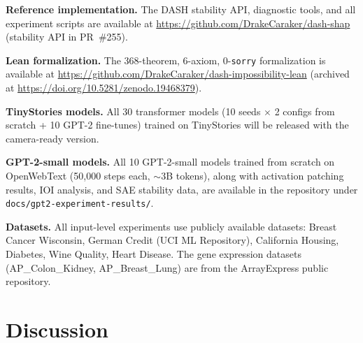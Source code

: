 \documentclass{article}
\begin{document}
\begin{sloppypar}
\noindent\textbf{Reference implementation.} The DASH stability API, diagnostic tools, and all experiment scripts are available at \url{https://github.com/DrakeCaraker/dash-shap} (stability API in PR~\#255).

\noindent\textbf{Lean formalization.} The 368-theorem, 6-axiom, 0-\texttt{sorry} formalization is available at \url{https://github.com/DrakeCaraker/dash-impossibility-lean} (archived at \url{https://doi.org/10.5281/zenodo.19468379}).

\noindent\textbf{TinyStories models.} All 30 transformer models (10 seeds $\times$ 2 configs from scratch + 10 GPT-2 fine-tunes) trained on TinyStories \citep{eldan2023tinystories} will be released with the camera-ready version.

\noindent\textbf{GPT-2-small models.} All 10 GPT-2-small models trained from scratch on OpenWebText (50{,}000 steps each, ${\sim}3$B tokens), along with activation patching results, IOI analysis, and SAE stability data, are available in the repository under \texttt{docs/gpt2-experiment-results/}.

\noindent\textbf{Datasets.} All input-level experiments use publicly available datasets: Breast Cancer Wisconsin, German Credit (UCI ML Repository), California Housing, Diabetes, Wine Quality, Heart Disease. The gene expression datasets (AP\_Colon\_Kidney, AP\_Breast\_Lung) are from the ArrayExpress public repository.
\end{sloppypar}


\section{Discussion}
\label{sec:discussion}
\end{document}
